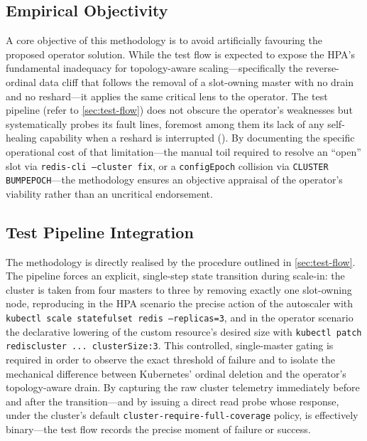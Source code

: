 \subsection{Empirical Objectivity}
A core objective of this methodology is to avoid artificially favouring the proposed operator solution. While the test flow is expected to expose the HPA's fundamental inadequacy for topology-aware scaling---specifically the reverse-ordinal data cliff that follows the removal of a slot-owning master with no drain and no reshard---it applies the same critical lens to the operator. The test pipeline (refer to \ref{sec:test-flow}) does not obscure the operator's weaknesses but systematically probes its fault lines, foremost among them its lack of any self-healing capability when a reshard is interrupted (\cite{redis_admin}). By documenting the specific operational cost of that limitation---the manual toil required to resolve an \enquote{open} slot via \texttt{redis-cli --cluster fix}, or a \texttt{configEpoch} collision via \texttt{CLUSTER BUMPEPOCH}---the methodology ensures an objective appraisal of the operator's viability rather than an uncritical endorsement.

\subsection{Test Pipeline Integration}
The methodology is directly realised by the procedure outlined in \ref{sec:test-flow}. The pipeline forces an explicit, single-step state transition during scale-in: the cluster is taken from four masters to three by removing exactly one slot-owning node, reproducing in the HPA scenario the precise action of the autoscaler with \texttt{kubectl scale statefulset redis --replicas=3}, and in the operator scenario the declarative lowering of the custom resource's desired size with \texttt{kubectl patch rediscluster ... clusterSize:3}. This controlled, single-master gating is required in order to observe the exact threshold of failure and to isolate the mechanical difference between Kubernetes' ordinal deletion and the operator's topology-aware drain. By capturing the raw cluster telemetry immediately before and after the transition---and by issuing a direct read probe whose response, under the cluster's default \texttt{cluster-require-full-coverage} policy, is effectively binary---the test flow records the precise moment of failure or success.

\vspace{2em}
